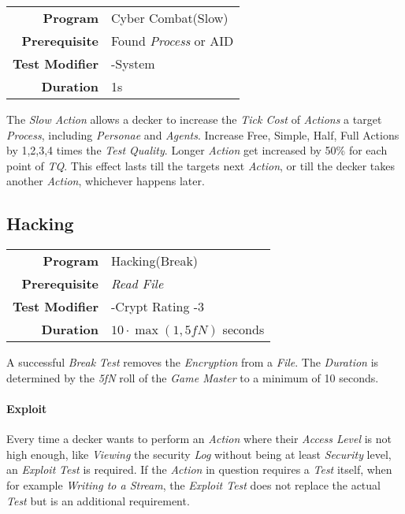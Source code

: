 \begin{tabular}{rl}
    \textbf{Program}       & Cyber Combat(Slow)          \\
    \textbf{Prerequisite}  & Found \emph{Process} or AID \\
    \textbf{Test Modifier} & -System                     \\
    \textbf{Duration}      & 1s                          \\
\end{tabular}

\hfill

The \emph{Slow Action} allows a decker to increase the \emph{Tick Cost} of
\emph{Actions} a target \emph{Process}, including \emph{Personae} and \emph{Agents}.
Increase Free, Simple, Half, Full Actions by 1,2,3,4 times the \emph{Test Quality}.
Longer \emph{Action} get increased by 50\% for each point of \emph{TQ}.
This effect lasts till the targets next \emph{Action}, or till the decker takes
another \emph{Action}, whichever happens later.

\subsection{Hacking}

\label{par:break}

\begin{tabular}{rl}
    \textbf{Program}       & Hacking(Break)                             \\
    \textbf{Prerequisite}  & \emph{Read File}                           \\
    \textbf{Test Modifier} & -Crypt Rating -3                           \\
    \textbf{Duration}      & \(10 \cdot \max(1, \textit{5fN})\) seconds \\
\end{tabular}

\hfill

A successful \emph{Break} \emph{Test} removes the \emph{Encryption} from a
\emph{File}. The \emph{Duration} is determined by the \emph{5fN} roll of the
\emph{Game Master} to a minimum of 10 seconds.

\paragraph{Exploit}

Every time a decker wants to perform an \emph{Action} where their \emph{Access Level}
is not high enough, like \emph{Viewing} the security \emph{Log} without being
at least \emph{Security} level, an \emph{Exploit} \emph{Test} is required.
If the \emph{Action} in question requires a \emph{Test} itself,
when for example \emph{Writing to a Stream}, the \emph{Exploit Test} does not
replace the actual \emph{Test} but is an additional requirement.

